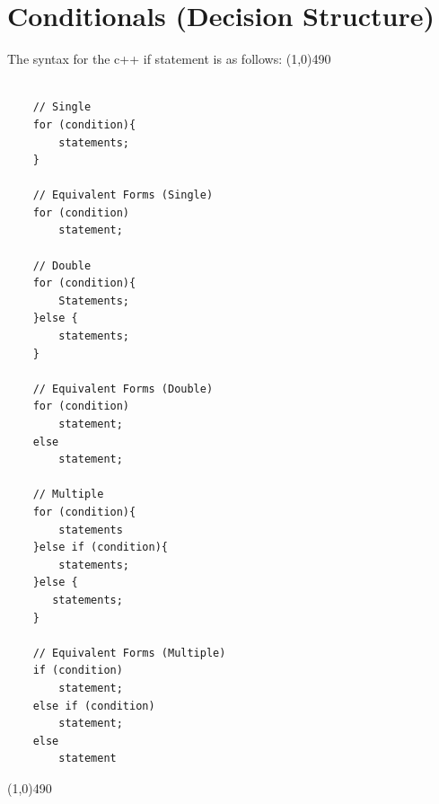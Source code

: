\documentclass{report}
\begin{document}
    \pagebreak \bigbreak \noindent 
    \section{\LARGE Conditionals (Decision Structure)}
    \bigbreak \noindent 
    The syntax for the c++ if statement is as follows:
    \smallbreak \noindent
    \line(1,0){490}
    \begin{verbatim}

    // Single
    for (condition){
        statements;
    }

    // Equivalent Forms (Single)
    for (condition)
        statement;

    // Double
    for (condition){
        Statements;
    }else {
        statements;
    }

    // Equivalent Forms (Double)
    for (condition)
        statement;
    else 
        statement;

    // Multiple
    for (condition){
        statements
    }else if (condition){
        statements;
    }else {
       statements; 
    }

    // Equivalent Forms (Multiple)
    if (condition)
        statement;
    else if (condition)
        statement;
    else 
        statement

    \end{verbatim}
    \line(1,0){490}

    \bigbreak \noindent 

    \pagebreak \bigbreak \noindent 
\end{document}
